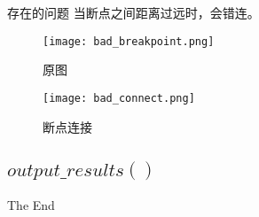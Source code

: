 \documentclass[10pt]{beamer}
\begin{document}
\begin{frame}{存在的问题}
当断点之间距离过远时，会错连。
\begin{figure}[H]
\begin{minipage}{0.48\linewidth}
  \centerline{\texttt{[image: bad\_breakpoint.png]}}
  \caption{原图}
\end{minipage}
\hfill
\begin{minipage}{0.48\linewidth}
  \centerline{\texttt{[image: bad\_connect.png]}}
  \caption{断点连接}
\end{minipage}
\end{figure}

\end{frame}
\subsection{$output\_results( )$}



\begin{frame}
\huge{\centerline{The End}}
\end{frame}
\end{document}
